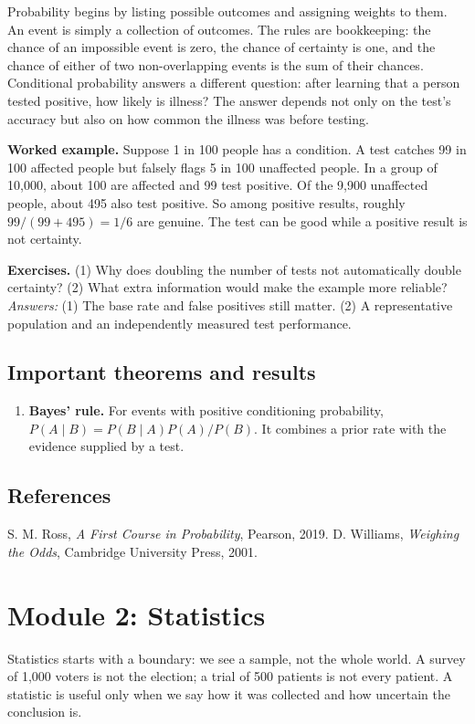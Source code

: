 \documentclass[11pt,oneside]{book}
\makeatletter
\renewenvironment{thebibliography}[1]
  {\list{\@biblabel{\@arabic\c@enumiv}}%
    {\settowidth\labelwidth{\@biblabel{#1}}%
     \leftmargin\labelwidth
     \advance\leftmargin\labelsep
     \usecounter{enumiv}%
     \let\p@enumiv\@empty
     \renewcommand\theenumiv{\@arabic\c@enumiv}}}
  {\endlist}
\makeatother
\begin{document}
Probability begins by listing possible outcomes and assigning weights to them. An event is simply a collection of outcomes. The rules are bookkeeping: the chance of an impossible event is zero, the chance of certainty is one, and the chance of either of two non-overlapping events is the sum of their chances. Conditional probability answers a different question: after learning that a person tested positive, how likely is illness? The answer depends not only on the test's accuracy but also on how common the illness was before testing.

\textbf{Worked example.} Suppose 1 in 100 people has a condition. A test catches 99 in 100 affected people but falsely flags 5 in 100 unaffected people. In a group of 10,000, about 100 are affected and 99 test positive. Of the 9,900 unaffected people, about 495 also test positive. So among positive results, roughly $99/(99+495)=1/6$ are genuine. The test can be good while a positive result is not certainty.

\textbf{Exercises.} (1) Why does doubling the number of tests not automatically double certainty? (2) What extra information would make the example more reliable? \emph{Answers:} (1) The base rate and false positives still matter. (2) A representative population and an independently measured test performance.

\section*{Important theorems and results}
\begin{enumerate}[leftmargin=*,itemsep=0.35em]
\item \textbf{Bayes' rule.} For events with positive conditioning probability, $P(A\mid B)=P(B\mid A)P(A)/P(B)$. It combines a prior rate with the evidence supplied by a test.
\end{enumerate}

\section*{References}
\begin{thebibliography}{9}
 S. M. Ross, \emph{A First Course in Probability}, Pearson, 2019.
 D. Williams, \emph{Weighing the Odds}, Cambridge University Press, 2001.
\end{thebibliography}


\chapter[Module 2: Statistics]{Module 2: Statistics}
Statistics starts with a boundary: we see a sample, not the whole world. A survey of 1,000 voters is not the election; a trial of 500 patients is not every patient. A statistic is useful only when we say how it was collected and how uncertain the conclusion is.
\end{document}
